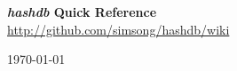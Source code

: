\documentclass[12pt]{article}
\newcommand{\hdb}{\emph{hashdb}\xspace}
\begin{document}
\begin{center}
\textbf{\Large \hdb Quick Reference} \\
\url{http://github.com/simsong/hashdb/wiki}
\end{center}



\vspace{2mm}
\begin{center}
\begin{footnotesize}
\today
\end{footnotesize}
\end{center}
\end{document}
